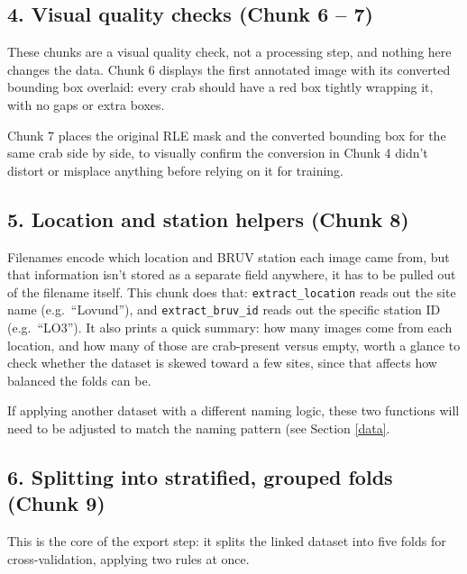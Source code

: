 \documentclass[
]{book}
\begin{document}
\subsection*{4. Visual quality checks (Chunk 6 -- 7)}\label{visual-quality-checks-chunk-6-7}

These chunks are a visual quality check, not a processing step, and nothing here changes the data. Chunk 6 displays the first annotated image with its converted bounding box overlaid: every crab should have a red box tightly wrapping it, with no gaps or extra boxes.

Chunk 7 places the original RLE mask and the converted bounding box for the same crab side by side, to visually confirm the conversion in Chunk 4 didn't distort or misplace anything before relying on it for training.

\subsection*{5. Location and station helpers (Chunk 8)}\label{location-and-station-helpers-chunk-8}

Filenames encode which location and BRUV station each image came from, but that information isn't stored as a separate field anywhere, it has to be pulled out of the filename itself. This chunk does that: \texttt{extract\_location} reads out the site name (e.g.~``Lovund''), and \texttt{extract\_bruv\_id} reads out the specific station ID (e.g.~``LO3''). It also prints a quick summary: how many images come from each location, and how many of those are crab-present versus empty, worth a glance to check whether the dataset is skewed toward a few sites, since that affects how balanced the folds can be.

If applying another dataset with a different naming logic, these two functions will need to be adjusted to match the naming pattern (see Section \ref{data}.

\subsection*{6. Splitting into stratified, grouped folds (Chunk 9)}\label{splitting-into-stratified-grouped-folds-chunk-9}

This is the core of the export step: it splits the linked dataset into five folds for cross-validation, applying two rules at once.
\end{document}
